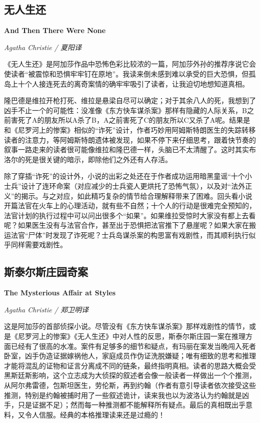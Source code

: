 \subsection*{无人生还}
\par \textbf{And Then There Were None}
\par \emph{Agatha Christie / 夏阳译} 

\par 《无人生还》是阿加莎作品中恐怖色彩比较浓的一篇，阿加莎外孙的推荐序说它会使读者“被震惊和恐惧牢牢钉在原地”。我读来倒未感到难以承受的巨大恐惧，但孤岛上十个人接连死去的离奇案情的确牢牢吸引了读者，让我迫切地想知道真相。
\par 隆巴德是维拉开枪打死、维拉是悬梁自尽可以确定；对于其余八人的死，我想到了凶手不止一个的可能性：没准像《东方快车谋杀案》那样有隐藏的人际关系，B之前害死了A的朋友所以A杀了B，A之前害死了C的朋友所以C又杀了A呢。结果是和《尼罗河上的惨案》相似的“诈死”设计，作者巧妙用阿姆斯特朗医生的失踪转移读者的注意力，等阿姆斯特朗遗体被发现，如果不停下来仔细思考，跟着快节奏的叙事一路走来的读者很可能像维拉和隆巴德一样，头脑已不太清醒了。这时其实布洛尔的死是很关键的暗示，即除他们之外还有人存活。 
\par 除了穿插“诈死”的设计外，小说的出彩之处还在于作者成功运用暗黑童谣“十个小士兵”设计了连环命案（对应减少的士兵瓷人更烘托了恐怖气氛），以及对“法外正义”的揭示。与之对应，如此精巧复杂的情节给合理解释带来了困难。回头看小说开篇法官在火车上的心理活动，就有些不自然；十个人的行动是很难完全预知的，法官计划的执行过程中可以问出很多个“如果”。如果维拉受惊时大家没有都上去看呢？如果医生没有与法官合作，甚至出于恐惧把法官推下了悬崖呢？如果大家在搬运法官“尸体”时发现了诈死呢？士兵岛谋杀案的构思富有戏剧性，而其顺利执行似乎同样需要戏剧性。
\par {}

\subsection*{斯泰尔斯庄园奇案}
\par \textbf{The Mysterious Affair at Styles}
\par \emph{Agatha Christie / 郑卫明译} 

\par 这是阿加莎的首部侦探小说。尽管没有《东方快车谋杀案》那样戏剧性的情节，或是《尼罗河上的惨案》《无人生还》中对人性的反思，斯泰尔斯庄园一案在推理方面已经有了很高的水准。案件有足够多的细节和疑点，有玛丽在案发当晚闯入死者卧室，凶手伪造证据嫁祸他人，家庭成员作伪证洗脱嫌疑；唯有细致的思考和推理才能将混乱的证物和证言分离成不同的链条，最终指明真相。读者的思路大概会受黑斯廷斯影响，这个立志成为大侦探的叙述者会像一般读者一样做出一个个推测，从阿尔弗雷德，包斯坦医生，劳伦斯，再到约翰（作者有意引导读者依次接受这些推测，特别是约翰被捕时用了一些叙述诡计，读来我也以为波洛认为约翰就是凶手，只是证据不足）；然而每一种推测都不能解释所有疑点。最后的真相既出乎意料，又令人信服。经典的本格推理读来还是过瘾的！
\par {}

